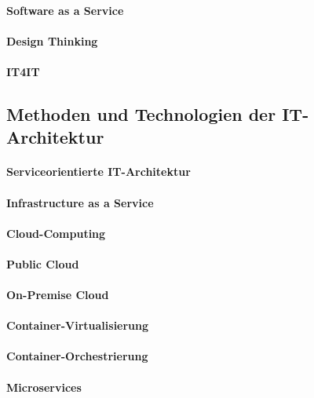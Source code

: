 \paragraph{Software as a Service}

\paragraph{Design Thinking}


\paragraph{IT4IT}

\subsection{Methoden und Technologien der IT-Architektur}

\paragraph{Serviceorientierte IT-Architektur}


\paragraph{Infrastructure as a Service}

\paragraph{Cloud-Computing}

\paragraph{Public Cloud}

\paragraph{On-Premise Cloud}

\paragraph{Container-Virtualisierung}

\paragraph{Container-Orchestrierung}

\paragraph{Microservices}